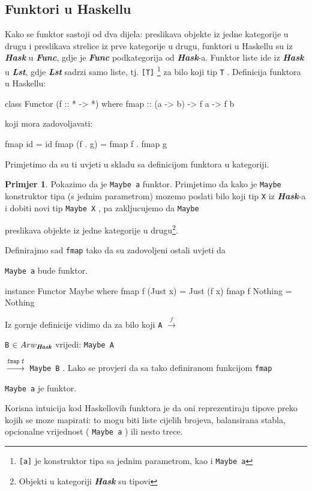 \documentclass[11pt]{article}
\newcommand{\category}[1]{\textbf{\emph{#1}}}
\newcommand{\codei}[1]{
  {\lstinline[basicstyle=\ttfamily]{#1}}
}
\theoremstyle{definition}
\newtheorem{primjer}{Primjer}
\begin{document}
  \subsection{Funktori u Haskellu}
  Kako se funktor sastoji od dva dijela: preslikava objekte iz jedne kategorije u drugu
  i preslikava strelice iz prve kategorije u drugu, funktori u Haskellu su iz
  \category{Hask} u \category{Func}, gdje je \category{Func} podkategorija od
  \category{Hask}-a. Funktor liste ide iz \category{Hask} u \category{Lst},
  gdje \category{Lst} sadrzi samo liste, tj. \codei{[T]}\footnote{
    \codei{[a]} je konstruktor tipa sa jednim parametrom,
    kao i \codei{Maybe a}}
  za bilo koji tip \codei{T}. Definicija funktora u Haskellu:
  \begin{mcode}
    class Functor (f :: * -> *) where
      fmap :: (a -> b) -> f a -> f b
  \end{mcode}
  koji mora zadovoljavati:
  \begin{mcode}
    fmap id = id
    fmap (f . g) = fmap f . fmap g
  \end{mcode}
  Primjetimo da su ti uvjeti u skladu sa definicijom funktora u kategoriji.
  \begin{primjer}
    Pokazimo da je \codei{Maybe a} funktor.
    Primjetimo da kako je \codei{Maybe} konstruktor tipa (s jednim
    parametrom) mozemo poslati bilo koji tip \codei{X} iz \category{Hask}-a i
    dobiti novi tip \codei{Maybe X}, pa zakljucujemo da \codei{Maybe}
    preslikava objekte iz jedne kategorije u drugu\footnote{Objekti u
      kategoriji \category{Hask} su tipovi}.

    Definirajmo sad \codei{fmap} tako da su zadovoljeni ostali uvjeti da
    \codei{Maybe a} bude funktor.
    \begin{mcode}
      instance Functor Maybe where
        fmap f (Just x) = Just (f x)
        fmap f Nothing = Nothing
    \end{mcode}
    Iz gornje definicije vidimo da za bilo koji \codei{A} $\xrightarrow{f}$
    \codei{B} $\in
    Arw_\category{Hask}$ vrijedi: \codei{Maybe A}
    $\xrightarrow{\texttt{fmap f}}$ \codei{Maybe B}.
    Lako se provjeri da sa tako definiranom funkcijom \codei{fmap} 
    \codei{Maybe a} je funktor.
  \end{primjer}
  Korisna intuicija kod Haskellovih funktora je da oni reprezentiraju tipove
  preko kojih se moze mapirati: to mogu biti liste cijelih brojeva,
  balansirana stabla, opcionalne vrijednost (\codei{Maybe a}) ili nesto trece.
\end{document}
